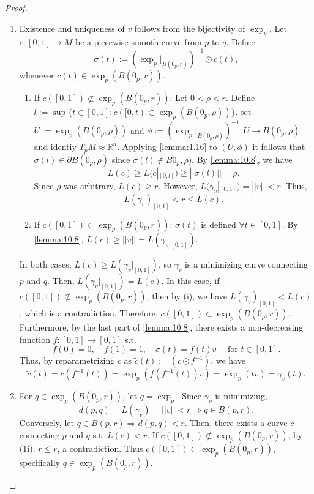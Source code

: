 \begin{proof}
\begin{enumerate}[label=(\arabic*)]
\item Existence and uniqueness of $v$ follows from the bijectivity of $\exp_p$.
Let $c:[0,1] \to M$ be a piecewise smooth curve from $p$ to $q$. Define
\[
\sigma(t) := (\exp_p|_{B(0_p,r)})^{-1}\odot c(t),
\]
whenever $c(t) \in \exp_p(B(0_p,r))$.
\begin{enumerate}[label=(\roman*)]
\item If $c([0,1]) \not\subset \exp_p(B(0_p,r))$: Let $0<\rho < r$.
Define $l := \sup\{t\in[0,1]:c([0,t)\subset\exp_p(B(0_p,\rho))\}$.
set $U := \exp_p(B(0_p,\rho))$ and $\phi := (\exp_p|_{B(0_p,\rho)})^{-1}:U \to B(0_p,\rho)$ and
identiy $T_pM \approx \mathbb{R}^n$. Applying \autoref{lemma:1.16} to $(U,\phi)$ it follows that
$\sigma(l) \in \partial B(0_p,\rho)$ since $\sigma(l) \notin B0_p,\rho)$. %
By \autoref{lemma:10.8}, we have 
\[
L(c) \geq L(c|_{[0,l]}) \geq ||\sigma(l)|| = \rho.
\]
Since $\rho$ was arbitrary, $L(c) \geq r$. However, $L(\gamma_v|_{[0,1]}) = ||v|| < r$. Thus,
\[
L(\gamma_v)_{[0,1]} < r \leq L(c).
\]
\item If $c([0,1])\subset\exp_p(B(0_p,r))$: $\sigma(t)$ is defined $\forall t \in [0,1]$.
By \autoref{lemma:10.8}, $L(c) \geq ||v|| = L(\gamma_v|_{[0,1]})$.
\end{enumerate}
In both cases, $L(c) \geq L(\gamma_v|_{[0,1]})$, so $\gamma_v$ is a minimizing curve
connecting $p$ and $q$. Then, $L(\gamma_v|_{[0,1]}) = L(c)$. In this case, if $c([0,1]) \not\subset\exp_p(B(0_p,r))$, then by
(i), we have $L(\gamma_v)_{[0,1]} < L(c)$, which is a contradiction. Therefore, $c([0,1]) \subset \exp_p(B(0_p,r))$. 
Furthermore, by the last part of \autoref{lemma:10.8}, there exists a non-decreasing function $f:[0,1]\to[0,1]$ s.t.
\[
f(0)=0,\quad f(1)=1, \quad \sigma(t) = f(t)v\quad \text{ for } t \in [0,1].
\]
Thus, by reparametrizing $c$ as $\tilde{c}(t) := (c\odot f^{-1})$, we have 
\[
\tilde{c}(t) = c(f^{-1}(t)) = \exp_p(f(f^{-1}(t))v) = \exp_p(tv) = \gamma_v(t).
\]
\item For $q \in \exp_p(B(0_p,r))$, let $q=\exp_p$.
Since $\gamma_v$ is minimizing,
\[
d(p,q) = L(\gamma_v) = ||v|| < r \Rightarrow q \in B(p,r).
\]
Conversely, let $q \in B(p,r) \Rightarrow d(p,q) < r$. Then, there exists a curve $c$ connecting $p$ and $q$ s.t. $L(c) <r$.
If $c([0,1]) \not\subset \exp_p(B(0_p,r))$, by (1i), $r \leq r$, a contradiction.
Thus $c([0,1]) \subset \exp_p(B(0_p,r))$, specifically $q \in \exp_p(B(0_p,r))$.
\end{enumerate}
\end{proof}

